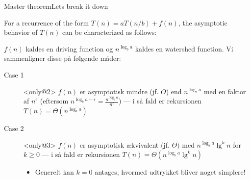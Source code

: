 \documentclass[aspectratio=1610]{beamer}
\begin{document}
\begin{frame}[t]{Master theorem}{Lets break it down}
    \begin{theorem}
        \small
        For a recurrence of the form $T(n) = aT(n/b) + f(n)$, the asymptotic
        behavior of $T(n)$ can be characterized as follows:

        \begin{enumerate}
        \end{enumerate}
    \end{theorem}

    $f(n)$ kaldes en \alert{driving function} og $n^{\log_b a}$ kaldes en
    \alert{watershed function}. Vi sammenligner disse på følgende måder:

    \begin{description}
        \item[Case 1]<only@2> $f(n)$ er \alert{asymptotisk mindre} (jf. $O$) end $n^{\log_b
            a}$ med en faktor af $n^{\epsilon}$ (eftersom $n^{\log_b a -
            \epsilon} = \frac{n^{\log_b a}}{n^{\epsilon}}$) --- i så fald er
            rekursionen $T(n) = \Theta(n^{\log_b a})$

        \item[Case 2]<only@3> $f(n)$ er \alert{asymptotisk ækvivalent} (jf. $\Theta)$
            med $n^{\log_b a} \lg^k n$ for $k \geq 0$ --- i så fald er
            rekursionen $T(n) = \Theta(n^{\log_b a} \lg^k n)$

            \begin{itemize}
                \item Generelt kan $k=0$ antages, hvormed udtrykket bliver noget
                    simplere!
            \end{itemize}


\end{description}
\end{frame}
\end{document}
